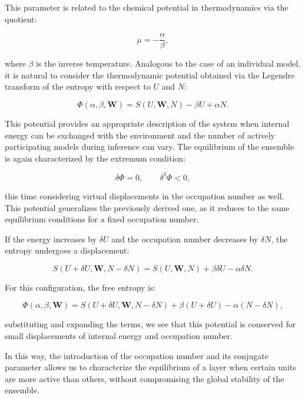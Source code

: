\documentclass[12pt]{article}
\begin{document}
This parameter is related to the chemical potential in thermodynamics via the quotient:

\begin{equation}
\mu = -\frac{\alpha}{\beta},
\end{equation}

where $\beta$ is the inverse temperature. Analogous to the case of an individual model, it is natural to consider the thermodynamic potential obtained via the Legendre transform of the entropy with respect to $U$ and $N$:

\begin{equation}
\Phi(\alpha, \beta, \mathbf{W}) = S(U, \mathbf{W}, N) - \beta U + \alpha N.
\end{equation}

This potential provides an appropriate description of the system when internal energy can be exchanged with the environment and the number of actively participating models during inference can vary. The equilibrium of the ensemble is again characterized by the extremum condition:

\begin{equation}
\delta \Phi = 0, \qquad \delta^2 \Phi < 0,
\end{equation}

this time considering virtual displacements in the occupation number as well. This potential generalizes the previously derived one, as it reduces to the same equilibrium conditions for a fixed occupation number.

If the energy increases by $\delta U$ and the occupation number decreases by $\delta N$, the entropy undergoes a displacement:

\begin{equation}
S(U+\delta U, \mathbf{W}, N- \delta N) = S(U, \mathbf{W},N) +\beta \delta U - \alpha \delta N.
\end{equation}

For this configuration, the free entropy is:

\begin{equation}
\Phi(\alpha, \beta, \mathbf{W}) = S(U+\delta U, \mathbf{W}, N- \delta N) + \beta(U + \delta U) - \alpha (N-\delta N),
\end{equation}

substituting and expanding the terms, we see that this potential is conserved for small displacements of internal energy and occupation number.

In this way, the introduction of the occupation number and its conjugate parameter allows us to characterize the equilibrium of a layer when certain units are more active than others, without compromising the global stability of the ensemble.
\end{document}
